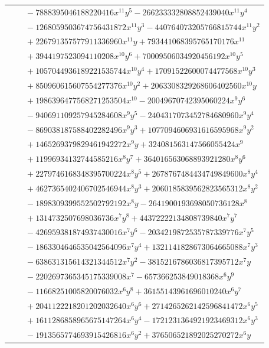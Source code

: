 \documentclass[11pt]{article}
\begin{document}
\begin{longtable}{@{}ll@{}}
 & $\quad -7888395046188220416x^{11}y^{5}-266233332808852439040x^{11}y^{4}$\\
 & $\quad -1268059503674756431872x^{11}y^{3}-440764073205766815744x^{11}y^{2}$\\
 & $\quad +226791357577911336960x^{11}y+793441068395765170176x^{11}$\\
 & $\quad +3944197523094110208x^{10}y^{6}+70009506034920456192x^{10}y^{5}$\\
 & $\quad +1057044936189221535744x^{10}y^{4}+17091522600074477568x^{10}y^{3}$\\
 & $\quad +850960615607554277376x^{10}y^{2}+2063308329268606402560x^{10}y$\\
 & $\quad +1986396477568271253504x^{10}-20049670742395060224x^{9}y^{6}$\\
 & $\quad -940691109257945284608x^{9}y^{5}-2404317073452784680960x^{9}y^{4}$\\
 & $\quad -869038187588402282496x^{9}y^{3}+1077094606931616595968x^{9}y^{2}$\\
 & $\quad +1465269379829461942272x^{9}y+324081563147566055424x^{9}$\\
 & $\quad +11996934132744585216x^{8}y^{7}+364016563068893921280x^{8}y^{6}$\\
 & $\quad +2279746168348395700224x^{8}y^{5}+2678767484434749849600x^{8}y^{4}$\\
 & $\quad +4627365402406702546944x^{8}y^{3}+2060185839562823565312x^{8}y^{2}$\\
 & $\quad -1898309399552502792192x^{8}y-2641900193698050736128x^{8}$\\
 & $\quad +1314732507698036736x^{7}y^{8}+44372222134808739840x^{7}y^{7}$\\
 & $\quad -426959381874937430016x^{7}y^{6}-2034219872535787339776x^{7}y^{5}$\\
 & $\quad -1863304646535042564096x^{7}y^{4}+1321141828673064665088x^{7}y^{3}$\\
 & $\quad -638631315614321344512x^{7}y^{2}-3815216786036817395712x^{7}y$\\
 & $\quad -2202697365345175339008x^{7}-657366253849018368x^{6}y^{9}$\\
 & $\quad -11668251005820076032x^{6}y^{8}+36155143961696010240x^{6}y^{7}$\\
 & $\quad +2041122218201202032640x^{6}y^{6}+2714265262142596841472x^{6}y^{5}$\\
 & $\quad +1611286858965675147264x^{6}y^{4}-1721231364921923469312x^{6}y^{3}$\\
 & $\quad -1913565774693915426816x^{6}y^{2}+376506521892025270272x^{6}y$\\

\end{longtable}
\end{document}
